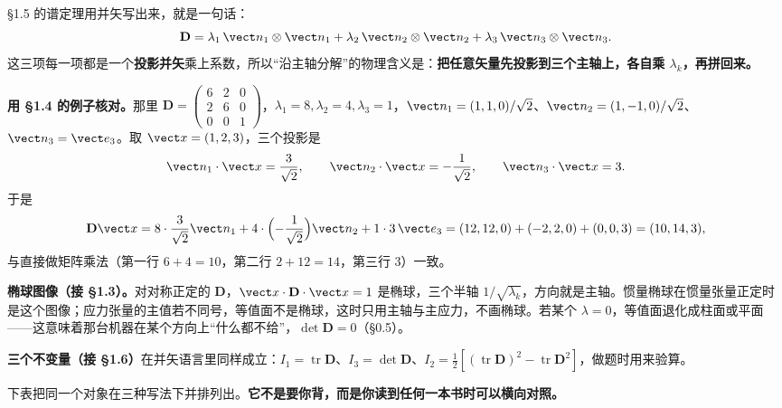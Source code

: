 \documentclass[11pt]{ctexart}
\newcommand{\ten}[1]{\mathbf{#1}}
\newcommand{\tr}{\operatorname{tr}}
\let\origsubhdr\subhdr
\renewcommand{\subhdr}[1]{\par\needspace{3\baselineskip}\origsubhdr{#1}}
\begin{document}

§1.5 的谱定理用并矢写出来，就是一句话：
\[
\ten D=\lambda_1\,\vect n_1\otimes\vect n_1+\lambda_2\,\vect n_2\otimes\vect n_2+\lambda_3\,\vect n_3\otimes\vect n_3 .
\]
这三项每一项都是一个\textbf{投影并矢}乘上系数，所以“沿主轴分解”的物理含义是：\textbf{把任意矢量先投影到三个主轴上，各自乘 $\lambda_k$，再拼回来。}

\textbf{用 §1.4 的例子核对。}那里 $\ten D=\begin{pmatrix}6&2&0\\2&6&0\\0&0&1\end{pmatrix}$，$\lambda_1=8,\lambda_2=4,\lambda_3=1$，$\vect n_1=(1,1,0)/\sqrt2$、$\vect n_2=(1,-1,0)/\sqrt2$、$\vect n_3=\vect e_3$。取 $\vect x=(1,2,3)$，三个投影是
\[
\vect n_1\cdot\vect x=\frac{3}{\sqrt2},\qquad
\vect n_2\cdot\vect x=-\frac{1}{\sqrt2},\qquad
\vect n_3\cdot\vect x=3 .
\]
于是
\[
\ten D\vect x=8\cdot\frac{3}{\sqrt2}\vect n_1+4\cdot\Bigl(-\frac{1}{\sqrt2}\Bigr)\vect n_2+1\cdot3\,\vect e_3
=(12,12,0)+(-2,2,0)+(0,0,3)=(10,14,3),
\]
与直接做矩阵乘法（第一行 $6+4=10$，第二行 $2+12=14$，第三行 $3$）一致。

\textbf{椭球图像（接 §1.3）。}对对称正定的 $\ten D$，$\vect x\cdot\ten D\cdot\vect x=1$ 是椭球，三个半轴 $1/\sqrt{\lambda_k}$，方向就是主轴。惯量椭球在惯量张量正定时是这个图像；应力张量的主值若不同号，等值面不是椭球，这时只用主轴与主应力，不画椭球。若某个 $\lambda=0$，等值面退化成柱面或平面——这意味着那台机器在某个方向上“什么都不给”，$\det\ten D=0$（§0.5）。

\textbf{三个不变量（接 §1.6）}在并矢语言里同样成立：$I_1=\tr\ten D$、$I_3=\det\ten D$、$I_2=\tfrac12[(\tr\ten D)^2-\tr\ten D^2]$，做题时用来验算。


下表把同一个对象在三种写法下并排列出。\textbf{它不是要你背，而是你读到任何一本书时可以横向对照。}
\end{document}
